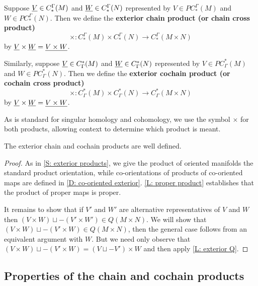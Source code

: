 \begin{definition}\label{D: exterior chain}
	Suppose $\underline{V} \in C_*^{\Gamma}(M)$ and $\underline{W} \in C_*^{\Gamma}(N)$ represented by $V \in PC_*^{\Gamma}(M)$ and $W \in PC_*^{\Gamma}(N)$. Then we define the \textbf{exterior chain product (or chain cross product)} $$\times: C_*^{\Gamma}(M) \times C_*^{\Gamma}(N) \to C_*^{\Gamma}(M \times N)$$ by $\underline{V} \times \underline{W} = \underline{V \times W}$.

	Similarly, suppose $\underline{V} \in C^*_{\Gamma}(M)$ and $\underline{W} \in C^*_{\Gamma}(N)$ represented by $V \in PC^*_{\Gamma}(M)$ and $W \in PC^*_{\Gamma}(N)$. Then we define the \textbf{exterior cochain product (or cochain cross product)} $$\times: C^*_{\Gamma}(M) \times C^*_{\Gamma}(N) \to C^*_{\Gamma}(M \times N)$$ by $\underline{V} \times \underline{W} = \underline{V \times W}$.
\end{definition}

As is standard for singular homology and cohomology, we use the symbol $\times$ for both products, allowing context to determine which product is meant.

\begin{proposition}
The exterior chain and cochain products are well defined.
\end{proposition}
\begin{proof}
As in \cref{S: exterior products}, we give the product of oriented manifolds the standard product orientation, while co-orientations of products of co-oriented maps are defined in \cref{D: co-oriented exterior}. \cref{L: proper product} establishes that the product of proper maps is proper.

It remains to show that if $V'$ and $W'$ are alternative representatives of $V$ and $W$ then $(V \times W) \sqcup -(V' \times W') \in Q(M \times N)$. We will show that $(V \times W) \sqcup -(V' \times W) \in Q(M \times N)$, then the general case follows from an equivalent argument with $W$. But we need only observe that $(V \times W) \sqcup -(V' \times W) = (V \sqcup -V') \times W$ and then apply
\cref{L: exterior Q}.
\end{proof}





\subsection{Properties of the chain and cochain products}\label{S: (co)chain properties}



